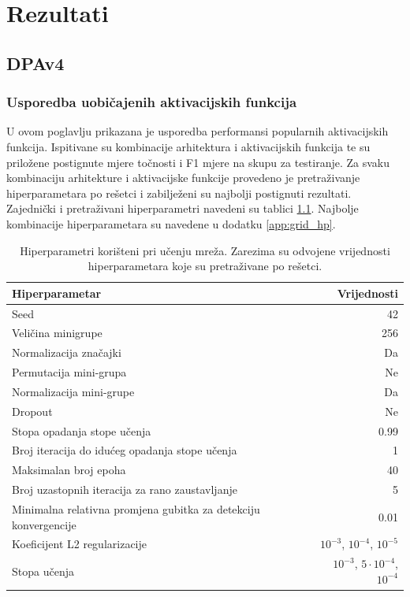 \documentclass[times, utf8, numeric, diplomski]{fer}
\begin{document}
\chapter{Rezultati}
\label{sec:rezultati}

\section{DPAv4}

\subsection{Usporedba uobičajenih aktivacijskih funkcija}
\label{sec:greedy_dpav4}
U ovom poglavlju prikazana je usporedba performansi popularnih aktivacijskih funkcija. Ispitivane su kombinacije arhitektura i aktivacijskih funkcija te su priložene postignute mjere točnosti i F1 mjere na skupu za testiranje. Za svaku kombinaciju arhitekture i aktivacijske funkcije provedeno je pretraživanje hiperparametara po rešetci i zabilježeni su najbolji postignuti rezultati. Zajednički i pretraživani hiperparametri navedeni su tablici \ref{tab:hp_common}. Najbolje kombinacije hiperparametara su navedene u dodatku \ref{app:grid_hp}.

\begin{table}
\centering
\begin{tabular}{lr}
Hiperparametar & Vrijednosti \\
\hline
Seed & 42 \\
Veličina minigrupe & 256 \\
Normalizacija značajki & Da \\
Permutacija mini-grupa & Ne \\
Normalizacija mini-grupe & Da \\
Dropout & Ne \\
Stopa opadanja stope učenja & 0.99 \\
Broj iteracija do idućeg opadanja stope učenja & 1 \\
Maksimalan broj epoha & 40 \\
Broj uzastopnih iteracija za rano zaustavljanje & 5 \\
Minimalna relativna promjena gubitka za detekciju konvergencije & 0.01 \\
\hline
Koeficijent L2 regularizacije & $10^{-3}$, $10^{-4}$, $10^{-5}$ \\
Stopa učenja & $10^{-3}$, $5 \cdot 10^{-4}$, $10^{-4}$
\end{tabular}
\caption{Hiperparametri korišteni pri učenju mreža. Zarezima su odvojene vrijednosti hiperparametara koje su pretraživane po rešetci.}
\label{tab:hp_common}
\end{table}
\end{document}

